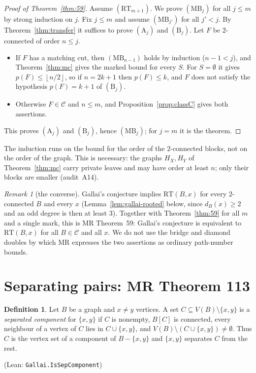 \documentclass[11pt]{amsart}
\theoremstyle{definition}
\newtheorem{definition}[theorem]{Definition}
\theoremstyle{remark}
\newtheorem{remark}[theorem]{Remark}
\renewcommand{\_}{\oldunderscore\allowbreak}
\newcommand{\leanst}[1]{\par{\raggedright\small\textup{(Lean: \texttt{#1})}\par}}
\newcommand{\cC}{\mathcal{C}}
\newcommand{\fl}[1]{\left\lfloor #1\right\rfloor}
\newcommand{\MBU}{\mathrm{MB}}
\newcommand{\RT}{\mathrm{RT}}
\newcommand{\TA}{\mathrm{A}}
\newcommand{\TB}{\mathrm{B}}
\begin{document}
\begin{proof}[Proof of Theorem~\ref{thm:59}]
Assume $(\RT_{m+1})$. We prove $(\MBU_j)$ for all $j\le m$ by strong induction on $j$. Fix $j\le m$
and assume $(\MBU_{j'})$ for all $j'<j$. By Theorem~\ref{thm:transfer} it suffices to prove
$(\TA_j)$ and $(\TB_j)$. Let $F$ be $2$-connected of order $n\le j$.
\begin{itemize}
\item If $F$ has a matching cut, then $(\MBU_{n-1})$ holds by induction ($n-1<j$), and
Theorem~\ref{thm:mc} gives the marked bound for every $S$. For $S=\emptyset$ it gives
$p(F)\le\fl{n/2}$, so if $n=2k+1$ then $p(F)\le k$, and $F$ does not satisfy the hypothesis
$p(F)=k+1$ of $(\TB_j)$.
\item Otherwise $F\in\cC$ and $n\le m$, and Proposition~\ref{prop:classC} gives both assertions.
\end{itemize}
This proves $(\TA_j)$ and $(\TB_j)$, hence $(\MBU_j)$; for $j=m$ it is the theorem.
\end{proof}

The induction runs on the bound for the order of the $2$-connected blocks, not on the order of the
graph. This is necessary: the graphs $H_X,H_Y$ of Theorem~\ref{thm:mc} carry private leaves and may
have order at least $n$; only their blocks are smaller (audit~A14).

\begin{remark}[the converse]\label{rem:59conv}
Gallai's conjecture implies $\RT(B,x)$ for every $2$-connected $B$ and every $x$
(Lemma~\ref{lem:gallai-rooted} below, since $d_B(x)\ge2$ and an odd degree is then at least $3$).
Together with Theorem~\ref{thm:59} for all $m$ and a single mark, this is MR Theorem~59: Gallai's
conjecture is equivalent to $\RT(B,x)$ for all $B\in\cC$ and all $x$. We do not use the bridge and
diamond doubles by which MR expresses the two assertions as ordinary path-number bounds.
\end{remark}

\section{Separating pairs: MR Theorem 113}\label{sec:sep}

\begin{definition}\label{def:sepcomp}
Let $B$ be a graph and $x\ne y$ vertices. A set $C\subseteq V(B)\setminus\{x,y\}$ is a
\emph{separated component} for $\{x,y\}$ if $C$ is nonempty, $B[C]$ is connected, every neighbour of
a vertex of $C$ lies in $C\cup\{x,y\}$, and $V(B)\setminus(C\cup\{x,y\})\ne\emptyset$. Thus $C$ is
the vertex set of a component of $B-\{x,y\}$ and $\{x,y\}$ separates $C$ from the rest.
\leanst{Gallai.IsSepComponent}
\end{definition}
\end{document}

